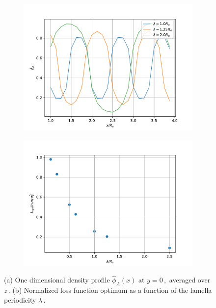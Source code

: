 \documentclass[bachelor,       %
               oneside,        %
               BCOR10mm,       %
               ngerman, english %
               ]{GAUBM}
\begin{document}
\begin{figure}[h]
  \centering
  \begin{subfigure}[b]{0.45\textwidth}
      \centering
      \includegraphics[width=\textwidth]{figures/amplitude_lamella_per.pdf}
      \caption{}
      \label{fig:amplitude_lamella_per}
  \end{subfigure}
    \hfill
  \begin{subfigure}[b]{0.45\textwidth}
      \centering
      \includegraphics[width=\textwidth]{figures/L_lambda.pdf}
      \caption{}
      \label{fig:L-lambda}
  \end{subfigure}
     \caption{(a) One dimensional density profile $\hat\phi_A(x)$ at $y=0\,,$ averaged over $z\,.$ (b) Normalized loss function optimum as a function of the lamella periodicity $\lambda\,.$}
     \label{fig:periodicity-lossfunction}
\end{figure}
\end{document}
